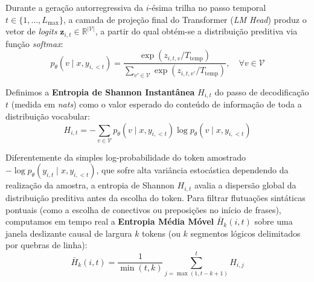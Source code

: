 \documentclass[9pt,conference]{IEEEtran}
\begin{document}
Durante a gera\c{c}\~{a}o autorregressiva da $i$-\'{e}sima trilha no passo temporal $t \in \{1, \dots, L_{\max}\}$, a camada de proje\c{c}\~{a}o final do Transformer (\textit{LM Head}) produz o vetor de \textit{logits} $\mathbf{z}_{i,t} \in \mathbb{R}^{|\mathcal{V}|}$, a partir do qual obt\'{e}m-se a distribui\c{c}\~{a}o preditiva via função \textit{softmax}:
\begin{equation}
p_\theta(v \mid x, y_{i,<t}) = \frac{\exp(z_{i,t,v} / T_{\text{temp}})}{\sum_{v' \in \mathcal{V}} \exp(z_{i,t,v'} / T_{\text{temp}})}, \quad \forall v \in \mathcal{V}
\label{eq:softmax_dist}
\end{equation}

Definimos a \textbf{Entropia de Shannon Instant\^{a}nea} $H_{i,t}$ do passo de decodifica\c{c}\~{a}o $t$ (medida em \textit{nats}) como o valor esperado do conte\'{u}do de informa\c{c}\~{a}o de toda a distribui\c{c}\~{a}o vocabular:
\begin{equation}
H_{i,t} = -\sum_{v \in \mathcal{V}} p_\theta(v \mid x, y_{i,<t}) \log p_\theta(v \mid x, y_{i,<t})
\label{eq:shannon_entropy}
\end{equation}

Diferentemente da simples log-probabilidade do token amostrado $-\log p_\theta(y_{i,t} \mid x, y_{i,<t})$, que sofre alta vari\^{a}ncia estoc\'{a}stica dependendo da realiza\c{c}\~{a}o da amostra, a entropia de Shannon $H_{i,t}$ avalia a dispers\~{a}o global da distribui\c{c}\~{a}o preditiva antes da escolha do token. Para filtrar flutua\c{c}\~{o}es sint\'{a}ticas pontuais (como a escolha de conectivos ou preposi\c{c}\~{o}es no in\'{i}cio de frases), computamos em tempo real a \textbf{Entropia M\'{e}dia M\'{o}vel} $\bar{H}_k(i, t)$ sobre uma janela deslizante causal de largura $k$ tokens (ou $k$ segmentos l\'{o}gicos delimitados por quebras de linha):
\begin{equation}
\bar{H}_k(i, t) = \frac{1}{\min(t, k)} \sum_{j=\max(1, t-k+1)}^{t} H_{i,j}
\label{eq:moving_avg_entropy}
\end{equation}
\end{document}
